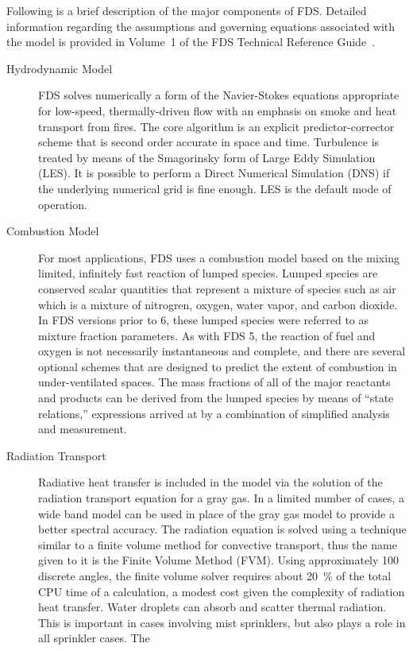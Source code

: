 \documentclass[11pt]{book}
\begin{document}
Following is a brief description of the major components of FDS. Detailed information regarding the assumptions and governing equations associated
with the model is provided in Volume~1 of the FDS Technical Reference Guide~\cite{FDS_Tech_Guide}.
\begin{description}
\item[Hydrodynamic Model] FDS
solves numerically a form of the Navier-Stokes equations appropriate for low-speed, thermally-driven flow with an emphasis on smoke and heat
transport from fires. The core algorithm is an explicit predictor-corrector scheme that is second order accurate in space and time. Turbulence is
treated by means of the Smagorinsky form of Large Eddy Simulation (LES). It is possible to perform a Direct Numerical Simulation (DNS) if the
underlying numerical grid is fine enough. LES is the default mode of operation.
\item[Combustion Model]
For most applications, FDS uses a combustion model based on the mixing limited, infinitely fast reaction of lumped species. Lumped species are
conserved scalar quantities that represent a mixture of species such as air which is a mixture of nitrogren, oxygen, water vapor, and carbon dioxide.
In FDS versions prior to 6, these lumped species were referred to as mixture fraction parameters.  As with FDS 5, the reaction of fuel and oxygen is
not necessarily instantaneous and complete, and there are several optional schemes that are designed to predict the extent of combustion in
under-ventilated spaces. The mass fractions of all of the major reactants and products can be derived from the lumped species by means of ``state
relations,'' expressions arrived at by a combination of simplified analysis and measurement.
\item[Radiation Transport] Radiative heat transfer is included in the
model via the solution of the radiation transport equation for a gray gas. In a limited number of cases, a wide band model can be used in place of
the gray gas model to provide a better spectral accuracy. The radiation equation is solved using a technique similar to a finite volume method for
convective transport, thus the name given to it is the Finite Volume Method (FVM). Using approximately 100 discrete angles, the finite volume solver
requires about 20~\% of the total CPU time of a calculation, a modest cost given the complexity of radiation heat transfer.  Water droplets can
absorb and scatter thermal radiation. This is important in cases involving mist sprinklers, but also plays a role in all sprinkler cases. The

\end{description}
\end{document}
